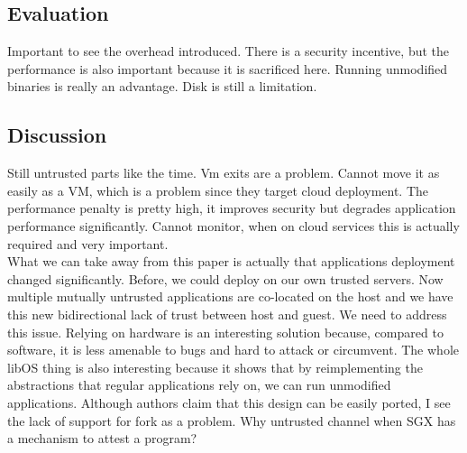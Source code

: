 \subsection{Evaluation}
Important to see the overhead introduced.
There is a security incentive, but the performance is also important because it is sacrificed here.
Running unmodified binaries is really an advantage.
Disk is still a limitation.


\subsection{Discussion}

Still untrusted parts like the time.
Vm exits are a problem.
Cannot move it as easily as a VM, which is a problem since they target cloud deployment.
The performance penalty is pretty high, it improves security but degrades application performance significantly.
Cannot monitor, when on cloud services this is actually required and very important.\\

What we can take away from this paper is actually that applications deployment changed significantly.
Before, we could deploy on our own trusted servers.
Now multiple mutually untrusted applications are co-located on the host and we have this new bidirectional lack of trust between host and guest.
We need to address this issue.
Relying on hardware is an interesting solution because, compared to software, it is less amenable to bugs and hard to attack or circumvent.
The whole libOS thing is also interesting because it shows that by reimplementing the abstractions that regular applications rely on, we can run unmodified applications.
Although authors claim that this design can be easily ported, I see the lack of support for fork as a problem.
Why untrusted channel when SGX has a mechanism to attest a program?




